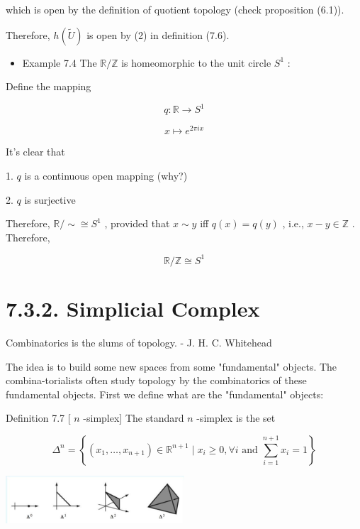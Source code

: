 which is open by the definition of quotient topology (check proposition (6.1)).

Therefore, \(h\left( \widetilde{U}\right)\) is open by (2) in definition (7.6).

\begin{itemize}
\item Example 7.4 The \(\mathbb{R}/\mathbb{Z}\) is homeomorphic to the unit circle \({S}^{1}\) :
\end{itemize}

Define the mapping

\[
q : \mathbb{R} \rightarrow  {S}^{1}
\]

\[
x \mapsto  {e}^{2\pi ix}
\]

It's clear that

1. \(q\) is a continuous open mapping (why?)

2. \(q\) is surjective

Therefore, \(\mathbb{R}/ \sim   \cong  {S}^{1}\) , provided that \(x \sim  y\) iff \(q\left( x\right)  = q\left( y\right)\) , i.e., \(x - y \in  \mathbb{Z}\) . Therefore,

\[
\mathbb{R}/\mathbb{Z} \cong  {S}^{1}
\]

\section*{7.3.2. Simplicial Complex}

Combinatorics is the slums of topology. - J. H. C. Whitehead

The idea is to build some new spaces from some "fundamental" objects. The combina-torialists often study topology by the combinatorics of these fundamental objects. First we define what are the "fundamental" objects:

Definition 7.7 [ \(n\) -simplex] The standard \(n\) -simplex is the set

\[
{\Delta }^{n} = \left\{  {\left( {{x}_{1},\ldots ,{x}_{n + 1}}\right)  \in  {\mathbb{R}}^{n + 1} \mid  {x}_{i} \geq  0,\forall i\text{ and }\mathop{\sum }\limits_{{i = 1}}^{{n + 1}}{x}_{i} = 1}\right\}
\]

\begin{center}
\includegraphics[max width=0.5\textwidth]{images/bo_d2bcsrref24c73avs720_73_642_599_672_178_0.jpg}
\end{center}
\hspace*{3em} 


